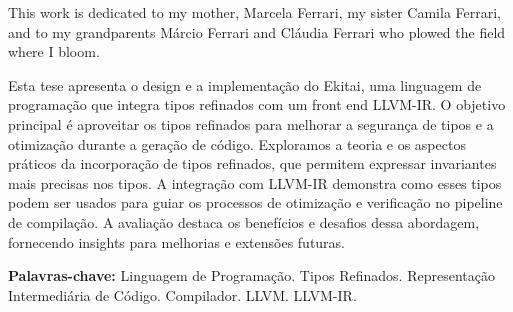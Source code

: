 \documentclass[
  oneside,
  english,
  coorientadorbanca,
  noabntexcite
]{ufsc-thesis-rn46-2019}
\begin{document}

\pretextual{}
\imprimircapa{}
\imprimirfolhaderosto*
\protect{}%
\imprimirfolhadecertificacao{}



\begin{dedicatoria}
  This work is dedicated to my mother, Marcela Ferrari, my sister Camila Ferrari, and to my grandparents Márcio Ferrari and Cláudia Ferrari who plowed the field where I bloom.
\end{dedicatoria}

\begin{resumo}[Resumo]
  Esta tese apresenta o design e a implementação do Ekitai, uma linguagem de programação que integra tipos refinados com um front end LLVM-IR. O objetivo principal é aproveitar os tipos refinados para melhorar a segurança de tipos e a otimização durante a geração de código. Exploramos a teoria e os aspectos práticos da incorporação de tipos refinados, que permitem expressar invariantes mais precisas nos tipos. A integração com LLVM-IR demonstra como esses tipos podem ser usados para guiar os processos de otimização e verificação no pipeline de compilação. A avaliação destaca os benefícios e desafios dessa abordagem, fornecendo insights para melhorias e extensões futuras.

  \vspace{\baselineskip}
  \textbf{Palavras-chave:} Linguagem de Programação\@. Tipos Refinados\@. Representação Intermediária de Código\@. Compilador\@. LLVM\@. LLVM-IR\@.
\end{resumo}
\end{document}
